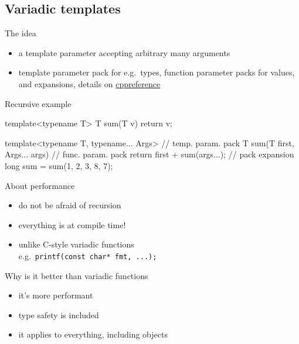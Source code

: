 \subsection[tmpl]{Variadic templates}


\begin{frame}[fragile]
  \begin{block}{The idea}
    \begin{itemize}
    \item a template parameter accepting arbitrary many arguments
    \item template parameter pack for e.g.\ types, function parameter packs for values, and expansions, details on \href{https://en.cppreference.com/w/cpp/language/parameter_pack}{cppreference}
    \end{itemize}
  \end{block}
  \begin{exampleblock}{Recursive example}
    \begin{cppcode*}{}
      template<typename T>
      T sum(T v) { return v; }

      template<typename T,
               typename... Args>     // temp. param. pack
      T sum(T first, Args... args) { // func. param. pack
        return first + sum(args...); // pack expansion
      }
      long sum = sum(1, 2, 3, 8, 7);
    \end{cppcode*}
  \end{exampleblock}
\end{frame}

\begin{frame}
  \begin{block}{About performance}
    \begin{itemize}
    \item do not be afraid of recursion
    \item everything is at compile time!
    \item unlike C-style variadic functions \\
          e.g.\ \texttt{printf(const char* fmt, ...);}
    \end{itemize}
  \end{block}
  \begin{block}{Why is it better than variadic functions}
    \begin{itemize}
    \item it's more performant
    \item type safety is included
    \item it applies to everything, including objects
    \end{itemize}
  \end{block}
\end{frame}

